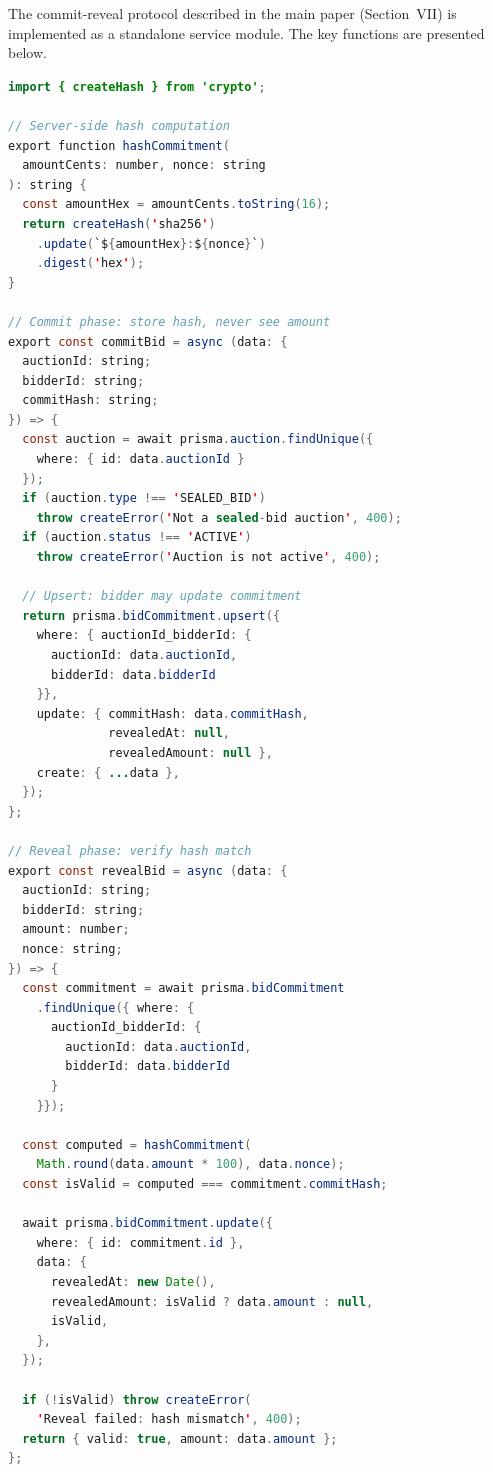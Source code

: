 \documentclass[11pt]{article}
\begin{document}
The commit-reveal protocol described in the main paper (Section~VII) is
implemented as a standalone service module. The key functions are presented
below.

\begin{lstlisting}[language=Java,caption={SHA-256 commitment hashing and verification.}]
import { createHash } from 'crypto';

// Server-side hash computation
export function hashCommitment(
  amountCents: number, nonce: string
): string {
  const amountHex = amountCents.toString(16);
  return createHash('sha256')
    .update(`${amountHex}:${nonce}`)
    .digest('hex');
}

// Commit phase: store hash, never see amount
export const commitBid = async (data: {
  auctionId: string;
  bidderId: string;
  commitHash: string;
}) => {
  const auction = await prisma.auction.findUnique({
    where: { id: data.auctionId }
  });
  if (auction.type !== 'SEALED_BID')
    throw createError('Not a sealed-bid auction', 400);
  if (auction.status !== 'ACTIVE')
    throw createError('Auction is not active', 400);

  // Upsert: bidder may update commitment
  return prisma.bidCommitment.upsert({
    where: { auctionId_bidderId: {
      auctionId: data.auctionId,
      bidderId: data.bidderId
    }},
    update: { commitHash: data.commitHash,
              revealedAt: null,
              revealedAmount: null },
    create: { ...data },
  });
};

// Reveal phase: verify hash match
export const revealBid = async (data: {
  auctionId: string;
  bidderId: string;
  amount: number;
  nonce: string;
}) => {
  const commitment = await prisma.bidCommitment
    .findUnique({ where: {
      auctionId_bidderId: {
        auctionId: data.auctionId,
        bidderId: data.bidderId
      }
    }});

  const computed = hashCommitment(
    Math.round(data.amount * 100), data.nonce);
  const isValid = computed === commitment.commitHash;

  await prisma.bidCommitment.update({
    where: { id: commitment.id },
    data: {
      revealedAt: new Date(),
      revealedAmount: isValid ? data.amount : null,
      isValid,
    },
  });

  if (!isValid) throw createError(
    'Reveal failed: hash mismatch', 400);
  return { valid: true, amount: data.amount };
};
\end{lstlisting}

\end{document}
